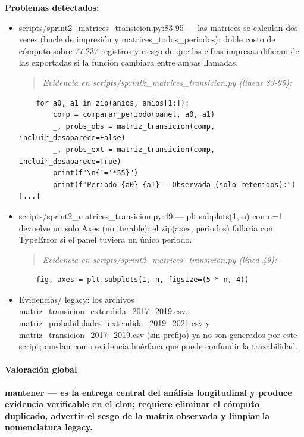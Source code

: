 \begin{tcolorbox}[riesgo]
\textbf{Problemas detectados:}
\begin{itemize}
  \item scripts/sprint2\_matrices\_transicion.py:83-95 --- las matrices se calculan dos veces (bucle de impresión y matrices\_todos\_periodos): doble costo de cómputo sobre 77.237 registros y riesgo de que las cifras impresas difieran de las exportadas si la función cambiara entre ambas llamadas.
\begin{quote}\footnotesize\ttfamily
\noindent\emph{Evidencia en scripts/sprint2\_matrices\_transicion.py (líneas 83-95):}
\end{quote}
\begin{lstlisting}
    for a0, a1 in zip(anios, anios[1:]):
        comp = comparar_periodo(panel, a0, a1)
        _, probs_obs = matriz_transicion(comp, incluir_desaparece=False)
        _, probs_ext = matriz_transicion(comp, incluir_desaparece=True)
        print(f"\n{'='*55}")
        print(f"Periodo {a0}–{a1} — Observada (solo retenidos):")
[...]
\end{lstlisting}

  \item scripts/sprint2\_matrices\_transicion.py:49 --- plt.subplots(1, n) con n=1 devuelve un solo Axes (no iterable); el zip(axes, periodos) fallaría con TypeError si el panel tuviera un único periodo.
\begin{quote}\footnotesize\ttfamily
\noindent\emph{Evidencia en scripts/sprint2\_matrices\_transicion.py (línea 49):}
\end{quote}
\begin{lstlisting}
    fig, axes = plt.subplots(1, n, figsize=(5 * n, 4))
\end{lstlisting}

  \item Evidencias/ legacy: los archivos matriz\_transicion\_extendida\_2017\_2019.csv, matriz\_probabilidades\_extendida\_2019\_2021.csv y matriz\_transicion\_2017\_2019.csv (sin prefijo) ya no son generados por este script; quedan como evidencia huérfana que puede confundir la trazabilidad.
\end{itemize}
\end{tcolorbox}

\paragraph{Valoración global}
\textbf{mantener --- es la entrega central del análisis longitudinal y produce evidencia verificable en el clon; requiere eliminar el cómputo duplicado, advertir el sesgo de la matriz observada y limpiar la nomenclatura legacy.}

